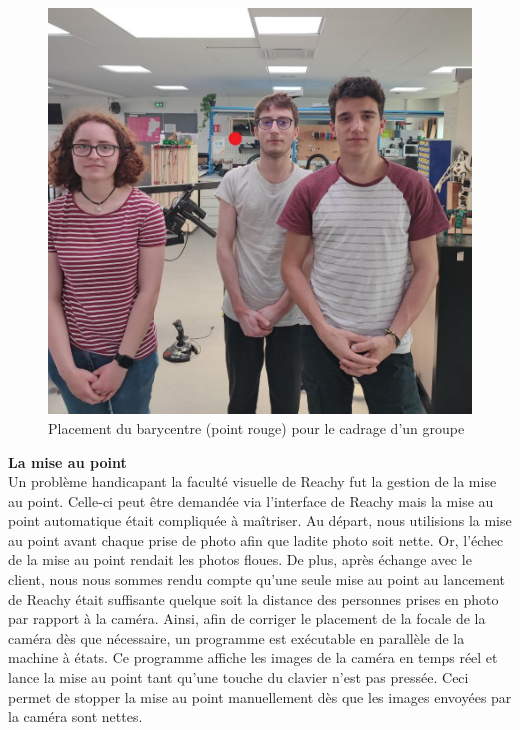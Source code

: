 \documentclass[a4paper,french]{article}
\begin{document}
\begin{figure}[H]
    \centering
    \includegraphics[scale=0.5]{figures/bary_groupe.jpg}
    \caption{Placement du barycentre (point rouge) pour le cadrage d'un groupe}
    \label{fig:Bary_groupe}
\end{figure}

\textbf{La mise au point}\\

Un problème handicapant la faculté visuelle de Reachy fut la gestion de la mise au point. Celle-ci peut être demandée via l'interface de Reachy mais la mise au point automatique était compliquée à maîtriser. Au départ, nous utilisions la mise au point avant chaque prise de photo afin que ladite photo soit nette. Or, l'échec de la mise au point rendait les photos floues. De plus, après échange avec le client, nous nous sommes rendu compte qu'une seule mise au point au lancement de Reachy était suffisante quelque soit la distance des personnes prises en photo par rapport à la caméra. Ainsi, afin de corriger le placement de la focale de la caméra dès que nécessaire, un programme est exécutable en parallèle de la machine à états. Ce programme affiche les images de la caméra en temps réel et lance la mise au point tant qu'une touche du clavier n'est pas pressée. Ceci permet de stopper la mise au point manuellement dès que les images envoyées par la caméra sont nettes.\\
\end{document}
